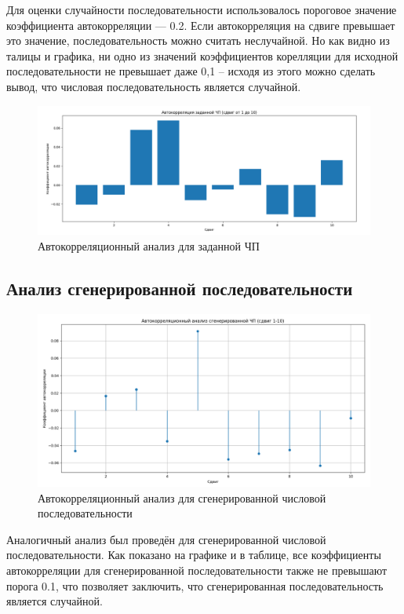 Для оценки случайности последовательности использовалось пороговое значение коэффициента автокорреляции — 0.2. Если автокорреляция на сдвиге превышает это значение, последовательность можно считать неслучайной. Но как видно из талицы и графика, ни одно из значений коэффициентов корелляции для исходной последовательности не превышает даже 0,1 -- исходя из этого можно сделать вывод, что числовая последовательность является случайной.

\begin{figure}[H]
	\centering
	\includegraphics[width=1\textwidth]{../data/auto_corellation-1.png}
	\caption{Автокорреляционный анализ для заданной ЧП}
\end{figure}


\subsection{Анализ сгенерированной последовательности}

\begin{figure}[H]
	\centering
	\includegraphics[width=1\textwidth]{../data/auto_corellation-2.png}
	\caption{Автокорреляционный анализ для сгенерированной числовой последовательности}
\end{figure}

Аналогичный анализ был проведён для сгенерированной числовой последовательности. Как показано на графике и в таблице, все коэффициенты автокорреляции для сгенерированной последовательности также не превышают порога 0.1, что позволяет заключить, что сгенерированная последовательность является случайной.

